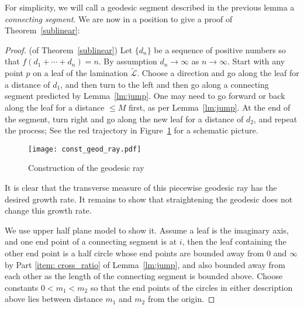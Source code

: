 \documentclass[11pt]{article} %
\theoremstyle{plain}
\theoremstyle{definition}
\numberwithin{equation}{section}
\begin{document}
For simplicity, we will call a geodesic segment described in the previous lemma a \emph{connecting segment}. We are now in a position to give a proof of Theorem~\ref{sublinear}:
\begin{proof}(of Theorem~\ref{sublinear})
Let $\{d_n\}$ be a sequence of positive numbers so that $f(d_1+\cdots+d_n)=n$. By assumption $d_n\to\infty$ as $n\to\infty$. Start with any point $p$ on a leaf of the lamination $\tilde{\mathcal{L}}$. Choose a direction and go along the leaf for a distance of $d_1$, and then turn to the left and then go along a connecting segment predicted by Lemma~\ref{lm:jump}. One may need to go forward or back along the leaf for a distance $\le M$ first, as per Lemma~\ref{lm:jump}. At the end of the segment, turn right and go along the new leaf for a distance of $d_2$, and repeat the process; See the red trajectory in Figure~\ref{fig:construction} for a schematic picture.
\begin{figure}[ht!]
    \centering
    \texttt{[image: const\_geod\_ray.pdf]}
    \iffalse
    \begin{tikzpicture}[scale=1.5]
    \draw (-7,0)--(3.5,0);
    \draw (0,0)--(0,5);
    \draw (0.4,0) arc (180:0:1.5);
    \draw (-0.8,0) arc (0:180:3);
    \draw[thick, red] (0,1) arc (90:51.607:1);
    \draw[thick, red] (0,1)--(0,2);
    \draw[thick, red] (0,2) arc (90:128.393:2);
    \draw[thick, red] (0.6210526315789474,0.7837688618520541) arc (148.499:175:1.5);
    \draw[thick, red] (-1.24211,1.56754) arc (31.5009:100:3);
    \draw[dashed, blue] (-6.8,0) arc (180:0:5.1);
    \draw[dashed, blue] (0.4,0) arc (0:180:0.6);
    
    \node[circle,fill, inner sep=1.5pt, label=below:$0$] at (0,0) {};
    \node[circle, fill, inner sep=1.5pt, label=left:$i$, red] at (0,1) {};
    \node[circle, fill, inner sep=1.5pt, label=right:$e^{d_n}i$, red] at (0,2) {};
    \node at (-0.2,1.5) {$L_n$};
    \node at (0.3,0.8) {$C_n$};
    \node at (-0.6,2.05) {$C_{n-1}$};
    \end{tikzpicture}
    \fi
    \caption{Construction of the geodesic ray}
    \label{fig:construction}
\end{figure}

It is clear that the transverse measure of this piecewise geodesic ray has the desired growth rate. It remains to show that straightening the geodesic does not change this growth rate.

We use upper half plane model to show it. Assume a leaf is the imaginary axis, and one end point of a connecting segment is at $i$, then the leaf containing the other end point is a half circle whose end points are bounded away from $0$ and $\infty$ by Part \ref{item: cross_ratio} of Lemma~\ref{lm:jump}, and also bounded away from each other as the length of the connecting segment is bounded above. %
Choose constants $0<m_1<m_2$ so that the end points of the circles in either description above lies between distance $m_1$ and $m_2$ from the origin.


\end{proof}
\end{document}
